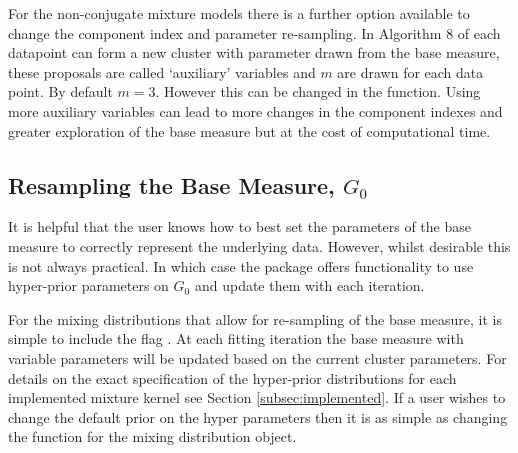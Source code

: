 \documentclass[nojss]{jss}
\begin{document}
For the non-conjugate mixture models there is a further option available to change the component index and parameter re-sampling. In Algorithm 8 of \cite{neal_markov_2000} each datapoint can form a new cluster with parameter drawn from the base measure, these proposals are called `auxiliary' variables and $m$ are drawn for each data point. By default $m=3$. However this can be changed in the  function. Using more auxiliary variables can lead to more changes in the component indexes and greater exploration of the base measure but at the cost of computational time.

\subsection{Resampling the Base Measure, $G_0$}
It is helpful that the user knows how to best set the parameters of the base measure to correctly represent the underlying data. However, whilst desirable this is not always practical. In which case the package offers functionality to use hyper-prior parameters on $G_0$ and update them with each iteration.

For the mixing distributions that allow for re-sampling of the base measure, it is simple to include the flag . At each fitting iteration the base measure with variable parameters will be updated based on the current cluster parameters. For details on the exact specification of the hyper-prior distributions for each implemented mixture kernel see Section \ref{subsec:implemented}.  If a user wishes to change the default prior on the hyper parameters then it is as simple as changing the  function for the mixing distribution object.



\end{document}
